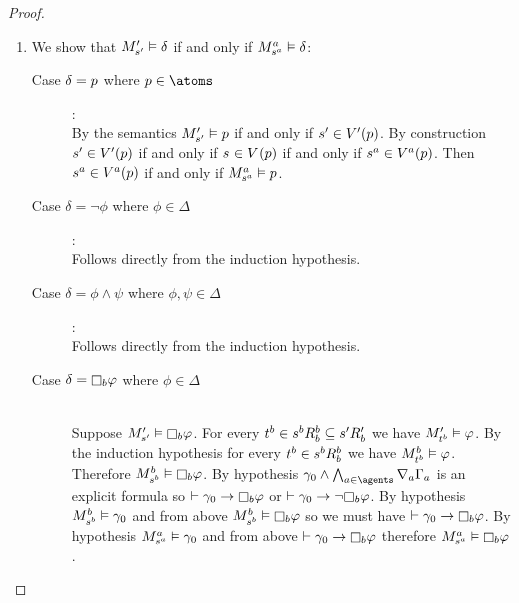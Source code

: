 \begin{proof}
\begin{enumerate}
    \item We show that $\kPModelP{\kStateSP} \entails \delta$ if and only if $\kPModel[\agentA]{\kStateS[\agentA]} \entails \delta$:
        \begin{description}
            \item[Case $\delta = \atomP$ where $\atomP \in \atoms$]:
                \hfill\\
                By the semantics $\kPModelP{\kStateSP} \entails \atomP$ if and only if $\kStateSP \in \kValuationP(\atomP)$.
                By construction $\kStateSP \in \kValuationP(\atomP)$ if and only if $\kStateS \in \kValuation(\atomP)$ if and only if $\kStateS[\agentA] \in \kValuation[\agentA](\atomP)$.
                Then $\kStateS[\agentA] \in \kValuation[\agentA](\atomP)$ if and only if $\kPModel[\agentA]{\kStateS[\agentA]} \entails \atomP$.
            \item[Case $\delta = \lnot \phi$ where $\phi \in \Delta$]:
                \hfill\\
                Follows directly from the induction hypothesis.
            \item[Case $\delta = \phi \land \psi$ where $\phi, \psi \in \Delta$]:
                \hfill\\
                Follows directly from the induction hypothesis.
            \item[Case $\delta = \necessaryB \phi$ where $\phi \in \Delta$]
                \hfill\\
                Suppose $\kPModelP{\kStateSP} \entails \necessaryB \phi$.
                For every $\kStateT[\agentB] \in \kSuccessorsB[\agentB]{\kStateS[\agentB]} \subseteq \kSuccessorsPB{\kStateSP}$ we have $\kPModelP{\kStateT[\agentB]} \entails \phi$.
                By the induction hypothesis for every $\kStateT[\agentB] \in \kSuccessorsB[\agentB]{\kStateS[\agentB]}$ we have $\kPModel[\agentB]{\kStateT[\agentB]} \entails \phi$.
                Therefore $\kPModel[\agentB]{\kStateS[\agentB]} \entails \necessaryB \phi$.
                By hypothesis $\gamma_0 \land \bigwedge_{\agentA \in \agents} \coversA \Gamma_\agentA$ is an explicit formula so $\proves \gamma_0 \implies \necessaryB \phi$ or $\proves \gamma_0 \implies \lnot \necessaryB \phi$.
                By hypothesis $\kPModel[\agentB]{\kStateS[\agentB]} \entails \gamma_0$ and from above $\kPModel[\agentB]{\kStateS[\agentB]} \entails \necessaryB \phi$ so we must have $\proves \gamma_0 \implies \necessaryB \phi$.
                By hypothesis $\kPModel[\agentA]{\kStateS[\agentA]} \entails \gamma_0$ and from above $\proves \gamma_0 \implies \necessaryB \phi$ therefore $\kPModel[\agentA]{\kStateS[\agentA]} \entails \necessaryB \phi$.


\end{description}
\end{enumerate}
\end{proof}
